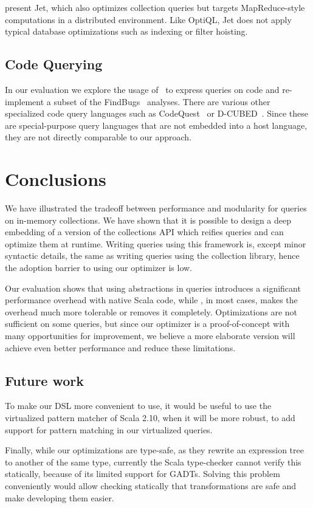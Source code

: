 \citet{Ackermann12} present Jet, which also optimizes collection queries but
targets MapRedu\-ce-style computations in a distributed environment.
Like OptiQL, Jet does not apply typical database optimizations such as
indexing or filter hoisting.

\section{Code Querying}
In our evaluation we explore the usage of \LoS\ to express queries on code and re-implement a subset of the FindBugs~\citep{DBLP:journals/sigplan/HovemeyerP04} analyses. There are various other specialized code query languages such as
CodeQuest~\citep{Hajiyev06CodeQuest} or D-CUBED~\citep{Wegrzynowicz:2009:GBU:1639950.1640032}.
Since these are special-purpose query languages that are not embedded into a host language, they are not directly comparable to our approach.



\chapter{Conclusions}
\label{ch:aosd13-concl}

We have illustrated the tradeoff between performance and modularity for queries on in-memory collections. We have shown that it is possible to design a deep embedding of a version of the collections API which reifies queries and can optimize them at runtime.
Writing queries using this framework is, except minor syntactic details, the same as writing queries using the collection library, hence the adoption barrier to using our optimizer is low.

Our evaluation shows that using abstractions in queries introduces a significant
performance overhead with native Scala code, while \LoS{}, in most cases, makes
the overhead much more tolerable or removes it completely. Optimizations are not
sufficient on some queries, but since our optimizer is a proof-of-concept with
many opportunities for improvement, we believe a more elaborate version will
achieve even better performance and reduce these limitations.

\section{Future work}

To make our DSL more convenient to use, it would be useful to use the
virtualized pattern matcher of Scala 2.10, when it will be more robust, to add
support for pattern matching in our virtualized queries.

Finally, while our optimizations are type-safe, as they rewrite an expression
tree to another of the same type, currently the Scala
type-checker cannot verify this statically, because of its limited support for
GADTs.
Solving this problem conveniently would allow checking statically that
transformations are safe and make developing them easier.
